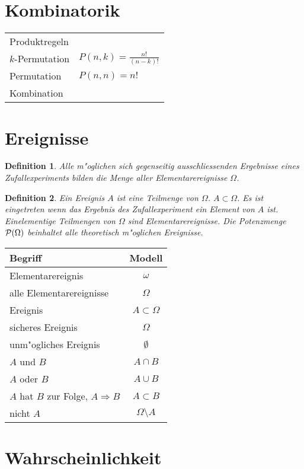 \documentclass[ngerman, a4paper, 10pt, twocolumn, DIV20, headings=small]{scrartcl}
\newtheorem{definition}{Definition}
\begin{document}
\section{Kombinatorik}
\label{sec:kombinatorik}

\begin{tabular}{l l}
  Produktregeln &  \\
  $k$-Permutation &  $P(n,k) = \frac{n!}{(n-k)!}$\\
  Permutation & $P(n,n) = n!$ \\
  Kombination & \\
\end{tabular}

\section{Ereignisse}
\label{sec:ereignisse}

\begin{definition}
  Alle m"oglichen sich gegenseitig ausschliessenden Ergebnisse eines Zufallexperiments bilden die Menge aller Elementarereignisse $\Omega$.
\end{definition}

\begin{definition}
  Ein Ereignis $A$ ist eine Teilmenge von $\Omega$. $A \subset \Omega$. Es ist eingetreten wenn das Ergebnis des Zufallexperiment ein Element von $A$ ist. Einelementige Teilmengen von $\Omega$ sind Elementarereignisse. Die Potenzmenge ${\cal P}(\Omega)$ beinhaltet alle theoretisch m"oglichen Ereignisse.
\end{definition}

\begin{tabular}{|l|c|}
\hline
Begriff&Modell\\
\hline
Elementarereignis&$\omega$\\
alle Elementarereignisse&$\Omega$\\
Ereignis&$A\subset\Omega$\\
sicheres Ereignis&$\Omega$\\
unm"ogliches Ereignis&$\emptyset$\\
$A$ und $B$&$A\cap B$\\
$A$ oder $B$&$A\cup B$\\
$A$ hat $B$ zur Folge, $A\Rightarrow B$&$A\subset B$\\
nicht $A$&$\Omega\setminus A$\\
\hline
\end{tabular}

\section{Wahrscheinlichkeit}
\label{sec:wahrscheinlichkeit}
\end{document}
